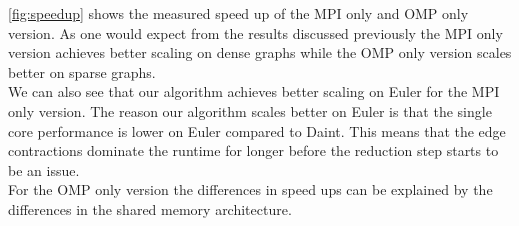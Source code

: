 \autoref{fig:speedup} shows the measured speed up of the MPI only and OMP only version. As one
would expect from the results discussed previously the MPI only version achieves better scaling on dense graphs while the OMP only version scales better on sparse graphs.\\
We can also see that our algorithm achieves better scaling on Euler for the MPI only version. The reason our algorithm scales better on Euler is that the single core performance is lower on Euler compared to Daint. This means that the edge contractions dominate the runtime for longer before the reduction step starts to be an issue.\\
For the OMP only version the differences in speed ups can be explained by the differences in the shared memory architecture.


